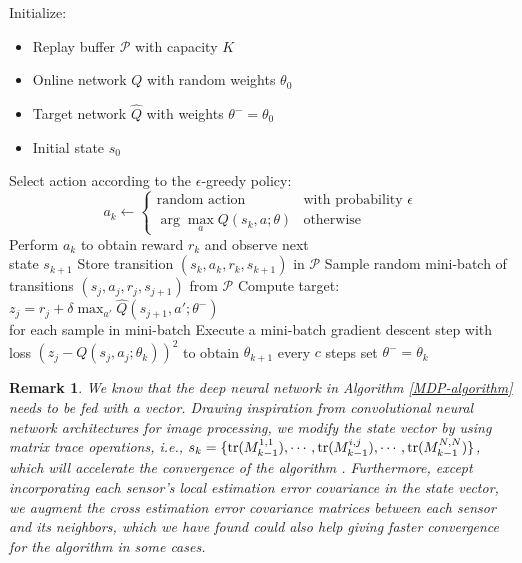 \documentclass[twocolumn]{IEEEtran}
\newtheorem{remark}{Remark}
\newcommand{\tr}{{\rm tr}}
\begin{document}
\begin{algorithm}\label{MDP-algorithm}
\caption{DQN for Distributed Wireless Relay Allocation}
\begin{algorithmic}[1]
\STATE Initialize:
    \begin{itemize}
        \item Replay buffer $\mathcal{P}$ with capacity $K$
        \item Online network $Q$ with random weights $\theta_0$
        \item Target network $\hat{Q}$ with weights $\theta^- = \theta_0$
        \item Initial state $s_0$
    \end{itemize}
    \STATE Select action according to the $\epsilon$-greedy policy:
        \[
        a_k \gets \begin{cases} 
            \text{random action} & \text{with probability $\epsilon$}  \\
            \arg\max_a Q(s_k, a; \theta) & \text{otherwise}
        \end{cases}
        \]
    \STATE Perform $a_k$ to obtain reward $r_k$ and observe next\\ state $s_{k+1}$
    \STATE Store transition $(s_k, a_k, r_k, s_{k+1})$ in $\mathcal{P}$
    \STATE Sample random mini-batch of transitions $(s_j, a_j, r_j, s_{j+1})$ from $\mathcal{P}$
    \STATE Compute target: $z_j = r_j + \delta \max_{a'} \hat{Q}(s_{j+1}, a'; \theta^-)$ \\for each sample in mini-batch
    \STATE Execute a mini-batch gradient descent step with loss $(z_j - Q(s_j, a_j; \theta_k))^2$ to obtain $\theta_{k+1}$
    \STATE every $c$ steps set $\theta^- = \theta_k$
\ENDFOR
\end{algorithmic}
\end{algorithm}
\begin{remark}

We know that the deep neural network in Algorithm \ref{MDP-algorithm} needs to be fed with a vector. Drawing inspiration from convolutional neural network architectures for image processing, we modify the state vector by using matrix trace operations, i.e., $s_{k}=\{\tr(M_{k-1}^{1,1}),\cdots,\tr (M_{k-1}^{i,j}),\cdots,\tr (M_{k-1}^{N,N})\}$, which will accelerate the convergence of the algorithm \cite{}. Furthermore, except incorporating each sensor's local estimation error covariance in the state vector, we augment the cross estimation error covariance matrices between each sensor and its neighbors, which we have found could also help giving faster convergence for the algorithm in some cases.
\end{remark}
\end{document}
